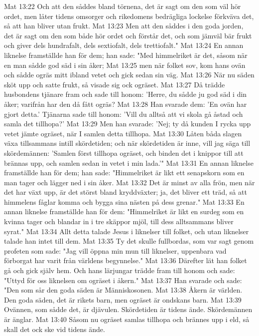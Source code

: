 Mat 13:22  Och att den såddes bland törnena, det är sagt om den som väl hör ordet, men låter tidens omsorger och rikedomens bedrägliga lockelse förkväva det, så att han bliver utan frukt.
Mat 13:23  Men att den såddes i den goda jorden, det är sagt om den som både hör ordet och förstår det, och som jämväl bär frukt och giver dels hundrafalt, dels sextiofalt, dels trettiofalt."
Mat 13:24  En annan liknelse framställde han för dem; han sade: "Med himmelriket är det, såsom när en man sådde god säd i sin åker;
Mat 13:25  men när folket sov, kom hans ovän och sådde ogräs mitt ibland vetet och gick sedan sin väg.
Mat 13:26  När nu säden sköt upp och satte frukt, så visade sig ock ogräset.
Mat 13:27  Då trädde husbondens tjänare fram och sade till honom: 'Herre, du sådde ju god säd i din åker; varifrån har den då fått ogräs?
Mat 13:28  Han svarade dem: 'En ovän har gjort detta.' Tjänarna sade till honom: 'Vill du alltså att vi skola gå åstad och samla det tillhopa?'
Mat 13:29  Men han svarade: 'Nej; ty då kunden I rycka upp vetet jämte ogräset, när I samlen detta tillhopa.
Mat 13:30  Låten båda slagen växa tillsammans intill skördetiden; och när skördetiden är inne, vill jag säga till skördemännen: 'Samlen först tillhopa ogräset, och binden det i knippor till att brännas upp, och samlen sedan in vetet i min lada.'"
Mat 13:31  En annan liknelse framställde han för dem; han sade: "Himmelriket är likt ett senapskorn som en man tager och lägger ned i sin åker.
Mat 13:32  Det är minst av alla frön, men när det har växt upp, är det störst bland kryddväxter; ja, det bliver ett träd, så att himmelens fåglar komma och bygga sina nästen på dess grenar."
Mat 13:33  En annan liknelse framställde han för dem: "Himmelriket är likt en surdeg som en kvinna tager och blandar in i tre skäppor mjöl, till dess alltsammans bliver syrat."
Mat 13:34  Allt detta talade Jesus i liknelser till folket, och utan liknelser talade han intet till dem.
Mat 13:35  Ty det skulle fullbordas, som var sagt genom profeten som sade: "Jag vill öppna min mun till liknelser, uppenbara vad förborgat har varit från världens begynnelse."
Mat 13:36  Därefter lät han folket gå och gick själv hem. Och hans lärjungar trädde fram till honom och sade: "Uttyd för oss liknelsen om ogräset i åkern."
Mat 13:37  Han svarade och sade: "Den som sår den goda säden är Människosonen.
Mat 13:38  Åkern är världen. Den goda säden, det är rikets barn, men ogräset är ondskans barn.
Mat 13:39  Ovännen, som sådde det, är djävulen. Skördetiden är tidens ände. Skördemännen är änglar.
Mat 13:40  Såsom nu ogräset samlas tillhopa och brännes upp i eld, så skall det ock ske vid tidens ände.
